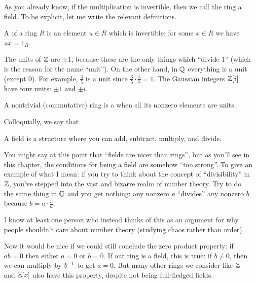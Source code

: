 As you already know, if the multiplication is invertible,
then we call the ring a field.
To be explicit, let me write the relevant definitions.

\begin{definition}
	\label{def:unit}
	A  of a ring $R$
	is an element $u \in R$ which is invertible:
	for some $x \in R$ we have $ux = 1_R$.
\end{definition}
\begin{example}
	\listhack
	\begin{enumerate}[(a)]
	\ii The units of $\mathbb Z$ are $\pm 1$,
	because these are the only things which ``divide $1$''
	(which is the reason for the name ``unit'').
	\ii On the other hand, in $\mathbb Q$ everything is a unit (except $0$).
	For example, $\frac 35$ is a unit since
	$\frac 35 \cdot \frac 53 = 1$.
	\ii The Gaussian integers $\mathbb Z[i]$ have four units:
	$\pm 1$ and $\pm i$.
	\end{enumerate}
\end{example}

\begin{definition}
	A nontrivial (commutative) ring is a 
	when all its nonzero elements are units.
\end{definition}

Colloquially, we say that
\begin{moral}
A field is a structure where you can add, subtract, multiply, and divide.
\end{moral}

\begin{remark}
	You might say at this point that ``fields are nicer than rings'',
	but as you'll see in this chapter, the conditions for
	being a field are somehow ``too strong''.
	To give an example of what I mean:
	if you try to think about the concept of ``divisibility''
	in $\mathbb Z$, you've stepped into the vast and bizarre realm of
	number theory.  Try to do the same thing in $\mathbb Q$ and you get nothing:
	any nonzero $a$ ``divides'' any nonzero $b$
	because $b = a \cdot \frac ba$.

	I know at least one person who instead
	thinks of this as an argument for why people
	shouldn't care about number theory
	(studying chaos rather than order).
\end{remark}

Now it would be nice if we could still conclude the zero product property:
if $ab = 0$ then either $a = 0$ or $b = 0$.
If our ring is a field, this is true: if $b \neq 0$,
then we can multiply by $b^{-1}$ to get $a = 0$.
But many other rings we consider like $\mathbb Z$ and $\mathbb Z[x]$ also have this property,
despite not being full-fledged fields.

